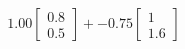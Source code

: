 \documentclass[preview]{standalone}
\begin{document}
\begin{align*}
1.00 \begin{bmatrix} 0.8 \\ 0.5 \end{bmatrix} + -0.75 \begin{bmatrix} 1 \\ 1.6 \end{bmatrix}
\end{align*}
\end{document}
